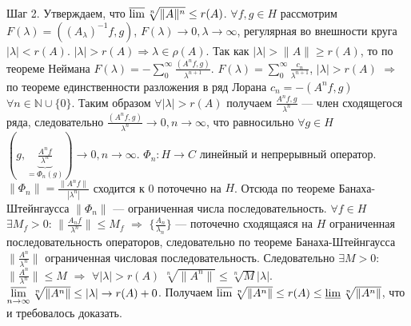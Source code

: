 \documentclass[12pt]{article}
\newcommand{\Al}{A_\lambda}
\newcommand{\Alo}{(\Al)^{-1}}
\begin{document}
Шаг 2.
Утверждаем, что $\varlimsup \sqrt[n]{\|A\|^n} \le r(A)$.
$\forall f, g \in H$ рассмотрим $F(\lambda) = (\Alo f, g)$, $F(\lambda) \to 0, \lambda \to \infty$, регулярная во внешности круга $|\lambda| < r(A)$.
$|\lambda| > r(A) \Rightarrow \lambda \in \rho(A)$. Так как $|\lambda| > \|A\| \ge r(A)$, то по теореме Неймана
$F(\lambda) = - \sum_0^\infty \frac{(A^n f, g)}{\lambda^{n + 1}}$.
$F(\lambda) = \sum_0^\infty \frac{c_n}{\lambda^{n + 1}}$, $|\lambda|>r(A)$ $\Rightarrow$ по теореме единственности разложения в ряд Лорана
$c_n = - (A^n f, g)$ $\forall n \in \mathbb N \cup \{0\}$.
Таким образом $\forall |\lambda| > r(A)$ получаем $\frac{A^n f, g}{\lambda^n}$ --- член сходящегося ряда, следовательно
$\frac{(A^n f, g)}{\lambda^n} \to 0, n \to \infty$, что равносильно $\forall g \in H$ $(g, \underbrace{\frac{A^n f}{\lambda^n}}_{=\Phi_n(g)}) \to 0, n \to \infty$.
$\Phi_n : H \to C$ линейный и непрерывный оператор.
$\|\Phi_n\| = \frac {\|A^n f\|}{|\lambda^n|}$ сходится к 0 поточечно на $H$.
Отсюда по теореме Банаха-Штейнгаусса $\|\Phi_n\|$ --- ограниченная числа последовательность. $\forall f \in H$ $\exists M_f > 0$: $\|\frac{A_n f}{\lambda^n}\|
\le M_f$ $\Rightarrow$ $\{\frac{A_n}{\lambda_n}\}$ --- поточечно сходящаяся на $H$ ограниченная последовательность операторов, следовательно
по теореме Банаха-Штейнгаусса $\|\frac{A^n}{\lambda^n}\|$ ограниченная числовая последовательность.
Следовательно $\exists M>0$: $\|\frac{A^n}{\lambda^n}\| \le M$ $\Rightarrow$ $\forall |\lambda| > r(A)$ $\sqrt[n]{\|A^n\|} \le \sqrt[n]{M}|\lambda|$.
$\varlimsup\limits_{n \to \infty} \sqrt[n]{\|A^n\|} \le |\lambda| \to r(A) + 0$.
Получаем $\varlimsup\sqrt[n]{\|A^n\|} \le r(A) \le \varliminf\sqrt[n]{\|A^n\|}$, что и требовалось доказать.
\end{document}
